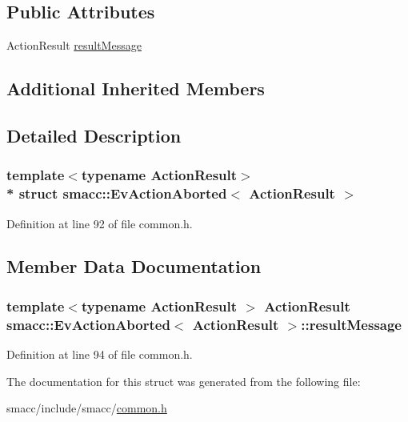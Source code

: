 \subsection*{Public Attributes}
\begin{DoxyCompactItemize}
\item 
Action\+Result \hyperlink{structsmacc_1_1EvActionAborted_a7c354cfc8477a6cc11731a05f81174aa}{result\+Message}
\end{DoxyCompactItemize}
\subsection*{Additional Inherited Members}


\subsection{Detailed Description}
\subsubsection*{template$<$typename Action\+Result$>$\\*
struct smacc\+::\+Ev\+Action\+Aborted$<$ Action\+Result $>$}



Definition at line 92 of file common.\+h.



\subsection{Member Data Documentation}
\subsubsection[{\texorpdfstring{result\+Message}{resultMessage}}]{\setlength{\rightskip}{0pt plus 5cm}template$<$typename Action\+Result $>$ Action\+Result {\bf smacc\+::\+Ev\+Action\+Aborted}$<$ Action\+Result $>$\+::result\+Message}\hypertarget{structsmacc_1_1EvActionAborted_a7c354cfc8477a6cc11731a05f81174aa}{}\label{structsmacc_1_1EvActionAborted_a7c354cfc8477a6cc11731a05f81174aa}


Definition at line 94 of file common.\+h.



The documentation for this struct was generated from the following file\+:\begin{DoxyCompactItemize}
\item 
smacc/include/smacc/\hyperlink{common_8h}{common.\+h}\end{DoxyCompactItemize}
